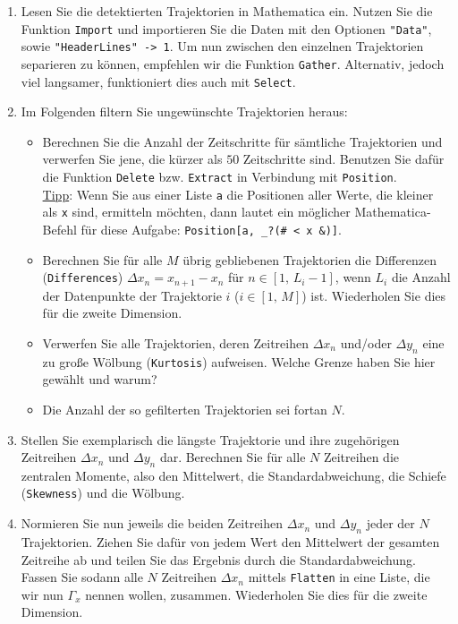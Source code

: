 \documentclass[a4paper,10pt]{article}
\begin{document}
\begin{enumerate}
 
 \item Lesen Sie die detektierten Trajektorien in Mathematica ein. Nutzen Sie die Funktion \texttt{Import} und importieren Sie die Daten mit den Optionen \texttt{"Data"}, sowie \texttt{"HeaderLines"\ -> 1}. Um nun zwischen den einzelnen Trajektorien separieren zu können, empfehlen wir die Funktion \texttt{Gather}. Alternativ, jedoch viel langsamer, funktioniert dies auch mit \texttt{Select}.
 \item Im Folgenden filtern Sie ungewünschte Trajektorien heraus:
 \begin{itemize}
  \item Berechnen Sie die Anzahl der Zeitschritte für sämtliche Trajektorien und verwerfen Sie jene, die kürzer als $50$ Zeitschritte sind. Benutzen Sie dafür die Funktion \texttt{Delete} bzw. \texttt{Extract} in Verbindung mit \texttt{Position}. \\ \uline{Tipp}: Wenn Sie aus einer Liste \texttt{a} die Positionen aller Werte, die kleiner als \texttt{x} sind, ermitteln möchten, dann lautet ein möglicher Mathe\-matica-Befehl für diese Aufgabe: \texttt{Position[a, \_?(\# < x \&)]}.
  \item Berechnen Sie für alle $M$ übrig gebliebenen Trajektorien die Differenzen (\texttt{Differences}) $\Delta x_n = x_{n+1} - x_{n}$ für $n\in[1,\,L_i-1]$, wenn $L_i$ die Anzahl der Datenpunkte der Trajektorie $i$ ($i\in[1,\,M]$) ist. Wiederholen Sie dies für die zweite Dimension. 
  \item Verwerfen Sie alle Trajektorien, deren Zeitreihen $\Delta x_n$ und/oder $\Delta y_n$ eine zu große Wölbung (\texttt{Kurtosis}) aufweisen. Welche Grenze haben Sie hier gewählt und warum?
  \item Die Anzahl der so gefilterten Trajektorien sei fortan $N$.
 \end{itemize}
 \item Stellen Sie exemplarisch die längste Trajektorie und ihre zugehörigen Zeit\-reihen $\Delta x_n$ und $\Delta y_n$ dar. Berechnen Sie für alle $N$ Zeitreihen die zentralen Momente, also den Mittelwert, die Standardabweichung, die Schiefe (\texttt{Skewness}) und die Wölbung.
 \item Normieren Sie nun jeweils die beiden Zeitreihen $\Delta x_n$ und $\Delta y_n$ jeder der $N$ Trajektorien. Ziehen Sie dafür von jedem Wert den Mittelwert der gesamten Zeitreihe ab und teilen Sie das Ergebnis durch die Standardabweichung. Fassen Sie sodann alle $N$ Zeitreihen $\Delta x_n$ mittels \texttt{Flatten} in eine Liste, die wir nun $\Gamma_x$ nennen wollen, zusammen. Wiederholen Sie dies für die zweite Dimension.

\end{enumerate}
\end{document}
